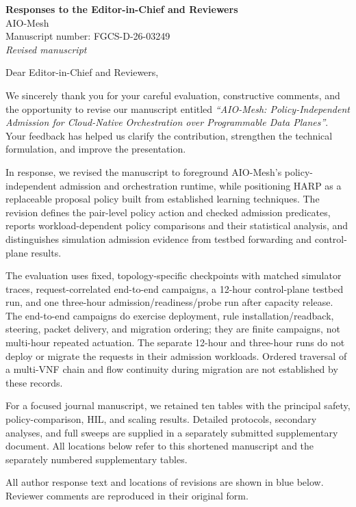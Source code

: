 \documentclass[11pt]{article}
\newcounter{reviewer}
\newcounter{comment}[reviewer]
\begin{document}
\begin{center}
{\LARGE\bfseries Responses to the Editor-in-Chief and Reviewers}\\[3mm]
{\large AIO-Mesh}\\[2mm]
Manuscript number: FGCS-D-26-03249\\[1mm]\textit{Revised manuscript}
\end{center}
Dear Editor-in-Chief and Reviewers,

We sincerely thank you for your careful evaluation, constructive comments, and the opportunity to revise our manuscript entitled \textit{``AIO-Mesh: Policy-Independent Admission for Cloud-Native Orchestration over Programmable Data Planes''}. Your feedback has helped us clarify the contribution, strengthen the technical formulation, and improve the presentation.

\textcolor{replyblue}{In response, we revised the manuscript to foreground AIO-Mesh's policy-independent admission and orchestration runtime, while positioning HARP as a replaceable proposal policy built from established learning techniques. The revision defines the pair-level policy action and checked admission predicates, reports workload-dependent policy comparisons and their statistical analysis, and distinguishes simulation admission evidence from testbed forwarding and control-plane results.}

\textcolor{replyblue}{The evaluation uses fixed, topology-specific checkpoints with matched simulator traces, request-correlated end-to-end campaigns, a 12-hour control-plane testbed run, and one three-hour admission/readiness/probe run after capacity release. The end-to-end campaigns do exercise deployment, rule installation/readback, steering, packet delivery, and migration ordering; they are finite campaigns, not multi-hour repeated actuation. The separate 12-hour and three-hour runs do not deploy or migrate the requests in their admission workloads. Ordered traversal of a multi-VNF chain and flow continuity during migration are not established by these records.}

\textcolor{replyblue}{For a focused journal manuscript, we retained ten tables with the principal safety, policy-comparison, HIL, and scaling results. Detailed protocols, secondary analyses, and full sweeps are supplied in a separately submitted supplementary document. All locations below refer to this shortened manuscript and the separately numbered supplementary tables.}

\textcolor{replyblue}{All author response text and locations of revisions are shown in blue below. Reviewer comments are reproduced in their original form.}
\end{document}
